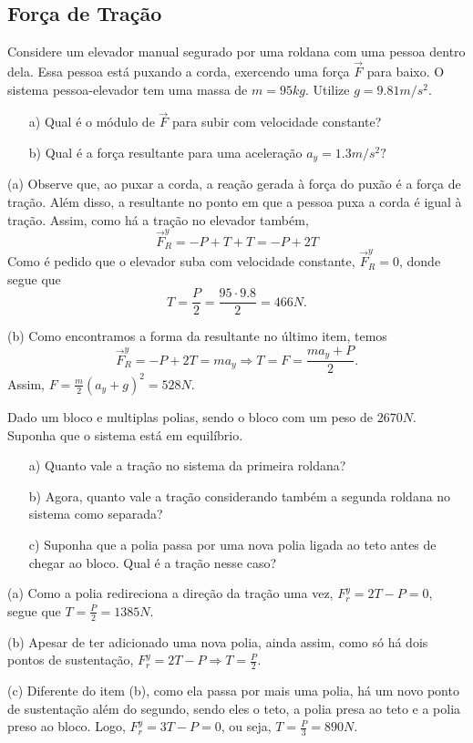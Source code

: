 \documentclass[PhysicsI/physics_notes.tex]{subfiles}
\begin{document}
\subsection{Força de Tração}
\begin{example}
	Considere um elevador manual segurado por uma roldana com uma pessoa dentro dela. Essa pessoa está puxando a corda, exercendo
	uma força $\vec{F}$ para baixo. O sistema pessoa-elevador tem uma massa de $m=95kg$. Utilize $g=9.81m/s^{2}$.
	\begin{itemize}
		\item[a)] Qual é o módulo de $\vec{F}$ para subir com velocidade constante?
		\item[b)] Qual é a força resultante para uma aceleração $a_{y}=1.3m/s^{2}?$
	\end{itemize}

	(a) Observe que, ao puxar a corda, a reação gerada à força do puxão é a força de tração. Além disso,
	a resultante no ponto em que a pessoa puxa a corda é igual à tração. Assim, como há a tração no elevador também,
	$$
		\vec{F}_{R}^{y}= -P + T + T = -P + 2T
	$$
	Como é pedido que o elevador suba com velocidade constante, $\vec{F}_{R}^{y} = 0$, donde segue que
	$$
		T = \frac{P}{2} = \frac{95 \cdot 9.8}{2} = 466N.
	$$

	(b) Como encontramos a forma da resultante no último item, temos
	$$
		\vec{F}_{R}^{y} = - P + 2T = ma_{y} \Rightarrow T = F = \frac{ma_{y}+P}{2}.
	$$
	Assim, $F = \frac{m}{2}(a_{y}+g)^{2} = 528N.$
\end{example}

\begin{example}
	Dado um bloco e multiplas polias, sendo o bloco com um peso de $2670N.$ Suponha que o sistema está em equilíbrio.
	\begin{itemize}
		\item[a)] Quanto vale a tração no sistema da primeira roldana?
		\item[b)] Agora, quanto vale a tração considerando também a segunda roldana no sistema como separada?
		\item[c)] Suponha que a polia passa por uma nova polia ligada ao teto antes de chegar ao bloco. Qual é a tração nesse caso?
	\end{itemize}

	(a) Como a polia redireciona a direção da tração uma vez, $F_{r}^{y} = 2T - P = 0,$ segue que $T = \frac{P}{2} = 1385N.$

	(b) Apesar de ter adicionado uma nova polia, ainda assim, como só há dois pontos de sustentação, $F_{r}^{y} = 2T - P \Rightarrow T = \frac{P}{2}.$

	(c) Diferente do item (b), como ela passa por mais uma polia, há um novo ponto de sustentação além do segundo, sendo eles
	o teto, a polia presa ao teto e a polia preso ao bloco. Logo, $F_{r}^{y} = 3T - P = 0$, ou seja, $T = \frac{P}{3} = 890N.$
\end{example}
\end{document}
